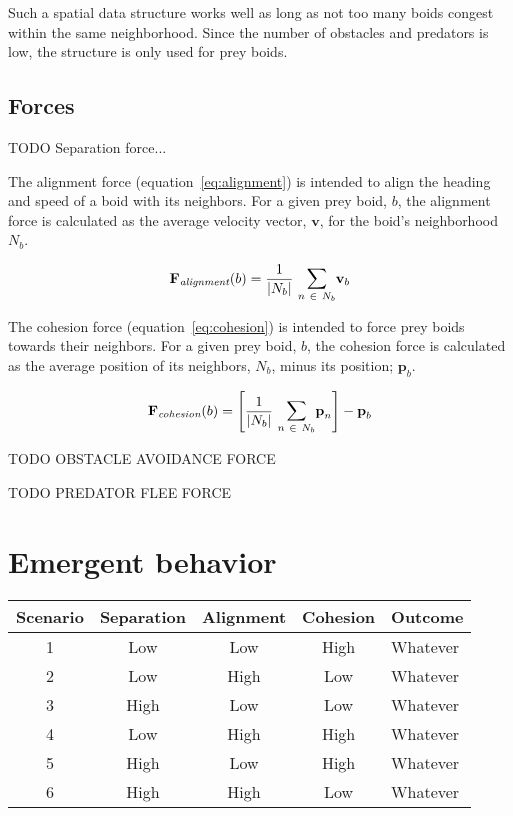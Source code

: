 Such a spatial data structure works well as long as not too many boids congest within the same neighborhood. Since the number of obstacles and predators is low, the structure is only used for prey boids.

\subsection*{Forces}

TODO Separation force...

The alignment force (equation~\ref{eq:alignment}) is intended to align the heading and speed of a boid with its neighbors. For a given prey boid, $b$, the alignment force is calculated as the average velocity vector, $\textbf{v}$, for the boid's neighborhood $N_b$.

\begin{equation}
\label{eq:alignment}
\textbf{F}_\textit{alignment}(b) = \frac{1}{\left\vert N_b \right\vert}~\mathlarger{\sum}_{n~\in~N_b} \textbf{v}_b
\end{equation}

The cohesion force (equation~\ref{eq:cohesion}) is intended to force prey boids towards their neighbors. For a given prey boid, $b$, the cohesion force is calculated as the average position of its neighbors, $N_b$, minus its position; $\textbf{p}_b$.

\begin{equation}
\label{eq:cohesion}
\textbf{F}_\textit{cohesion}(b) = \Bigg[\frac{1}{\left\vert N_b \right\vert}~\mathlarger{\sum}_{n~\in~N_b} \textbf{p}_n\Bigg] - \textbf{p}_b
\end{equation}

TODO OBSTACLE AVOIDANCE FORCE

TODO PREDATOR FLEE FORCE


\section*{Emergent behavior}

\begin{tabularx}{\textwidth}{@{} c c c c Y @{}}
\toprule
Scenario & Separation & Alignment & Cohesion & Outcome \\
 & Low  & Low  & High & Whatever \\
2 & Low  & High & Low  & Whatever \\
3 & High & Low  & Low  & Whatever \\
4 & Low  & High & High & Whatever \\
5 & High & Low  & High & Whatever \\
6 & High & High & Low  & Whatever \\
\bottomrule
\end{tabularx}



